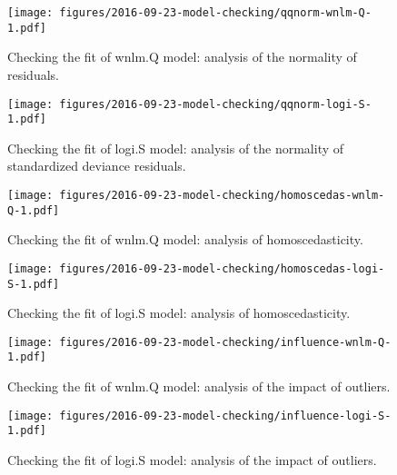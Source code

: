\documentclass[letterpaper]{article}
\begin{document}
\begin{figure}
\begin{center}
\texttt{[image: figures/2016-09-23-model-checking/qqnorm-wnlm-Q-1.pdf]}
\end{center}
\caption{
Checking the fit of wnlm.Q model: analysis of the normality of residuals.
}
\label{fig:qqnorm-wnlm.Q}
\end{figure}

\begin{figure}
\begin{center}
\texttt{[image: figures/2016-09-23-model-checking/qqnorm-logi-S-1.pdf]}
\end{center}
\caption{
Checking the fit of logi.S model: analysis of the normality of standardized deviance residuals.
}
\label{fig:qqnorm-logi.S}
\end{figure}

\begin{figure}
\begin{center}
\texttt{[image: figures/2016-09-23-model-checking/homoscedas-wnlm-Q-1.pdf]}
\end{center}
\caption{
Checking the fit of wnlm.Q model: analysis of homoscedasticity.
}
\label{fig:homoscedas-wnlm.Q}
\end{figure}

\begin{figure}
\begin{center}
\texttt{[image: figures/2016-09-23-model-checking/homoscedas-logi-S-1.pdf]}
\end{center}
\caption{
Checking the fit of logi.S model: analysis of homoscedasticity.
}
\label{fig:homoscedas-logi.S}
\end{figure}

\begin{figure}
\begin{center}
\texttt{[image: figures/2016-09-23-model-checking/influence-wnlm-Q-1.pdf]}
\end{center}
\caption{
Checking the fit of wnlm.Q model: analysis of the impact of outliers.
}
\label{fig:influence-wnlm.Q}
\end{figure}

\begin{figure}
\begin{center}
\texttt{[image: figures/2016-09-23-model-checking/influence-logi-S-1.pdf]}
\end{center}
\caption{
Checking the fit of logi.S model: analysis of the impact of outliers.
}
\label{fig:influence-logi.S}
\end{figure}
\end{document}
